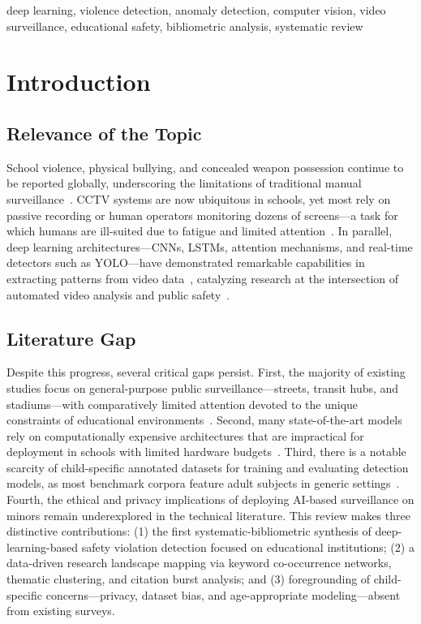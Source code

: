 \documentclass[conference]{IEEEtran}
\begin{document}
\begin{IEEEkeywords}
deep learning, violence detection, anomaly detection, computer vision, video surveillance, educational safety, bibliometric analysis, systematic review
\end{IEEEkeywords}

\section{Introduction}

\subsection{Relevance of the Topic}

School violence, physical bullying, and concealed weapon possession continue to be reported globally, underscoring the limitations of traditional manual surveillance~\cite{b1,b2}. CCTV systems are now ubiquitous in schools, yet most rely on passive recording or human operators monitoring dozens of screens---a task for which humans are ill-suited due to fatigue and limited attention~\cite{b3,b4}. In parallel, deep learning architectures---CNNs, LSTMs, attention mechanisms, and real-time detectors such as YOLO---have demonstrated remarkable capabilities in extracting patterns from video data~\cite{b5,b6,b7}, catalyzing research at the intersection of automated video analysis and public safety~\cite{b8,b9,b10}.

\subsection{Literature Gap}

Despite this progress, several critical gaps persist. First, the majority of existing studies focus on general-purpose public surveillance---streets, transit hubs, and stadiums---with comparatively limited attention devoted to the unique constraints of educational environments~\cite{b11,b12}. Second, many state-of-the-art models rely on computationally expensive architectures that are impractical for deployment in schools with limited hardware budgets~\cite{b13,b14}. Third, there is a notable scarcity of child-specific annotated datasets for training and evaluating detection models, as most benchmark corpora feature adult subjects in generic settings~\cite{b15,b16}. Fourth, the ethical and privacy implications of deploying AI-based surveillance on minors remain underexplored in the technical literature. This review makes three distinctive contributions: (1) the first systematic-bibliometric synthesis of deep-learning-based safety violation detection focused on educational institutions; (2) a data-driven research landscape mapping via keyword co-occurrence networks, thematic clustering, and citation burst analysis; and (3) foregrounding of child-specific concerns---privacy, dataset bias, and age-appropriate modeling---absent from existing surveys.
\end{document}
